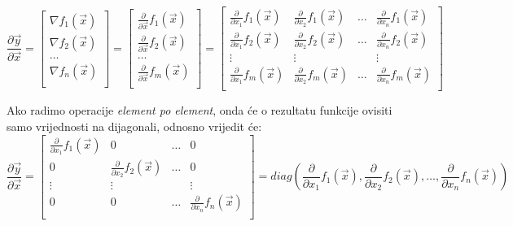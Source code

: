 \documentclass[zavrsnirad]{fer}
\begin{document}
\begin{equation}
  \frac{\partial \vec{y}}{\partial \vec{x}} =
  \begin{bmatrix}
    \nabla f_1(\vec{x}) \\
    \nabla f_2(\vec{x}) \\
    \dots \\
    \nabla f_n(\vec{x}) \\
  \end{bmatrix}
  =
  \begin{bmatrix}
    \frac{\partial}{\partial \vec{x}} f_1(\vec{x}) \\
    \frac{\partial}{\partial \vec{x}} f_2(\vec{x}) \\
    \dots \\
    \frac{\partial}{\partial \vec{x}} f_m(\vec{x}) \\
  \end{bmatrix}
  =
  \begin{bmatrix}
    \frac{\partial}{\partial x_1} f_1(\vec{x}) & \frac{\partial}{\partial x_2} f_1(\vec{x}) & \dots & \frac{\partial}{\partial x_n} f_1(\vec{x}) \\
    \frac{\partial}{\partial x_1} f_2(\vec{x}) & \frac{\partial}{\partial x_2} f_2(\vec{x}) & \dots & \frac{\partial}{\partial x_n} f_2(\vec{x}) \\
    \vdots & \vdots & & \vdots \\
    \frac{\partial}{\partial x_1} f_m(\vec{x}) & \frac{\partial}{\partial x_2} f_m(\vec{x}) & \dots & \frac{\partial}{\partial x_n} f_m(\vec{x}) \\
  \end{bmatrix}
\end{equation}
\cite{matrix_calculus}

Ako radimo operacije \textit{element po element}, onda će o rezultatu funkcije ovisiti samo vrijednosti na dijagonali, odnosno vrijedit će:
\begin{equation}
  \frac{\partial \vec{y}}{\partial \vec{x}} =
  \begin{bmatrix}
    \frac{\partial}{\partial x_1} f_1(\vec{x}) & 0 & \dots & 0 \\
    0 & \frac{\partial}{\partial x_2} f_2(\vec{x}) & \dots & 0 \\
    \vdots & \vdots & & \vdots \\
    0 & 0 & \dots & \frac{\partial}{\partial x_n} f_n(\vec{x}) \\
  \end{bmatrix}
  = diag(\frac{\partial}{\partial x_1} f_1(\vec{x}), \frac{\partial}{\partial x_2} f_2(\vec{x}), \dots, \frac{\partial}{\partial x_n} f_n(\vec{x}))
\end{equation}
\cite{matrix_calculus}
\end{document}
